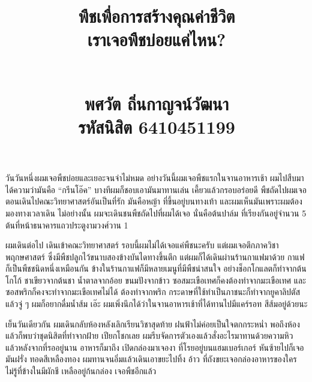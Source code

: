 \documentclass{article}
\title{\flushleft\Large พืชเพื่อการสร้างคุณค่าชีวิต\\
\Huge\textbf{เราเจอพืชบ่อยแค่ไหน?}\\
\rule{0em}{1ex}\\
\normalsize พศวัต ถิ่นกาญจน์วัฒนา\\
รหัสนิสิต 6410451199
\vspace{-8ex}}
\author{}
\date{}
\begin{document}
\maketitle
\sloppy\flushleft
วันวันหนึ่งผมเจอพืชบ่อยและเยอะจนจำไม่หมด อย่างวันนี้ผมเจอพืชแรกในจานอาหารเช้า ผมไปสืบมาได้ความว่ามันคือ ``กรีนโอ๊ค''
บางทีผมก็ชอบเอามันมาทานเล่น เคี้ยวแล้วกรอบอร่อยดี พืชถัดไปผมเจอตอนเดินไปคณะวิทยาศาสตร์อันเป็นที่รัก
มันคือหญ้า ที่ขึ้นอยู่บนทางเท้า และผมเห็นมันเพราะผมต้องมองทางเวลาเดิน ไม่อย่างนั้น ผมจะเดินชนพืชถัดไปที่ผมได้เจอ
นั่นคือต้นปาล์ม ที่เรียงกันอยู่จำนวน 5 ต้นที่หน้าธนาคารแถวประตูงามวงศ์วาน 1

\rule{0em}{1ex}

ผมเดินต่อไป เดินเข้าคณะวิทยาศาสตร์ รอบนี้ผมไม่ได้เจอแค่พืชนะครับ แต่ผมเจอตึกภาควิชาพฤกษศาสตร์ ซึ่งมีพืชปลูกไว้ขนาบสองข้างบันไดทางขึ้นตึก
แต่ผมก็ได้เดินผ่านร้านกาแฟมาด้วย กาแฟ ก็เป็นพืชชนิดหนึ่งเหมือนกัน ข้างในร้านกาแฟก็มีหลายเมนูที่มีพืชน่าสนใจ อย่างช็อกโกแลตก็ทำจากต้นโกโก้
ชาเขียวจากต้นชา น้ำตาลจากอ้อย ขนมปังจากข้าว ซอสมะเขือเทศก็คงต้องทำจากมะเขือเทศ
และซอสพริกก็คงจะทำจากมะเขือเทศไม่ได้ ต้องทำจากพริก กระดาษที่ใช้ทำเป็นภาชนะก็ทำจากยูคาลิปตัส
แล้วจู่ ๆ ผมก็อยากดื่มน้ำส้ม เอ๊ะ ผมเพิ่งนึกได้ว่าในจานอาหารเช้าที่ได้ทานไปมีแคร์รอท สีส้มอยู่ด้วยนะ

\rule{0em}{1ex}

เย็นวันเดียวกัน ผมเดินกลับห้องหลังเลิกเรียนวิชาสุดท้าย ฝนฟ้าไม่ค่อยเป็นใจตกกระหน่ำ พอถึงห้องแล้วก็พบว่าชุดนิสิตที่ทำจากฝ้าย เปียกโชกเลย
ผมรีบจัดการตัวเองแล้วสั่งอะไรมาทานด้วยความหิว แล้วหลังจากที่รออยู่นาน อาหารก็มาถึง เปิดกล่องมาเจองา ที่โรยอยู่บนแฮมเบอร์เกอร์
หันซ้ายไปก็เจอมันฝรั่ง ทอดสีเหลืองทอง ผมทานจนอิ่มแล้วเดินเอาขยะไปทิ้ง อ้าว ที่ถังขยะเจอกล่องอาหารของใครไม่รู้ที่ข้างในมีผักชี เหลืออยู่ก้นกล่อง เจอพืชอีกแล้ว
\end{document}
